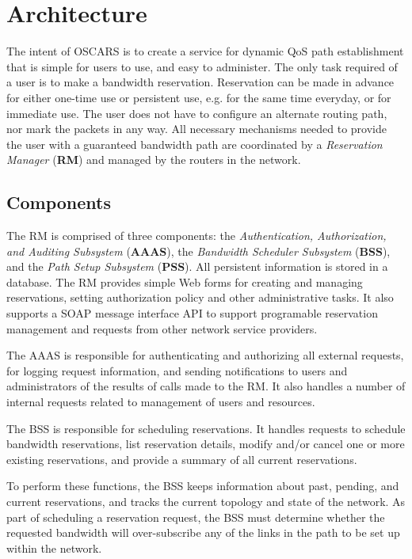\documentclass[conference]{IEEEtran}
\begin{document}
\section{Architecture}

The intent of OSCARS is to create a service for dynamic QoS path establishment
that is simple for users to use, and easy to administer.  The only task 
required of a user is to make a bandwidth reservation.  Reservation can be made 
in advance for either one-time use or persistent use, e.g. for the same time 
everyday, 
or for immediate use. The user does not have 
to configure an alternate routing path, nor mark the packets in any way.  All 
necessary mechanisms needed to provide the user with a guaranteed bandwidth 
path are coordinated by a  \emph{Reservation Manager} (\textbf{RM}) and managed by the routers 
in the network.

\subsection{Components}

The RM is comprised of three components:  the 
 \emph{Authentication, Authorization, and Auditing Subsystem} (\textbf{AAAS}), 
the  \emph{Bandwidth Scheduler Subsystem} (\textbf{BSS}), and the  \emph{Path 
Setup Subsystem} (\textbf{PSS}). All persistent information is stored in a 
database.  
The RM provides simple Web forms for creating and managing reservations, 
setting authorization policy and other administrative tasks.
It also supports a SOAP message interface API to support programable 
reservation 
management and requests from other network service providers.

The AAAS is responsible for authenticating and authorizing all external 
requests, for logging request information, and sending notifications to
users and administrators of the results of calls made to the RM.  It also
handles a number of internal requests related to management of users 
and resources.

The BSS is responsible for scheduling reservations.  It handles
requests to schedule bandwidth reservations, list reservation details,
modify and/or cancel one or more existing reservations, and provide a summary
of all current reservations.

To perform these functions, the BSS keeps information about past,
pending, and current reservations, and tracks the current topology and state of
the network.  As part of scheduling a reservation request, the BSS must
determine whether the requested bandwidth will over-subscribe any of the links
in the path to be set up within the network.
\end{document}
